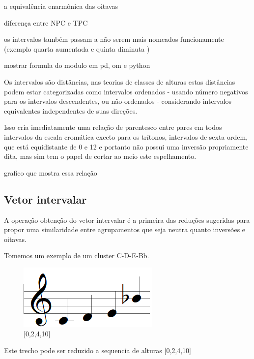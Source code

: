\documentclass[
	12pt,				%
	openright,			%
	twoside,			%
	a4paper,			%
	english,			%
	french,				%
	spanish,			%
	brazil				%
	]{abntex2}
\begin{document}
a equivalência enarmônica das oitavas

diferença entre NPC e TPC \cite[p. 118]{temperley2004cognition}

os intervalos também passam a não serem mais nomeados funcionamente (exemplo quarta aumentada e quinta diminuta )

mostrar formula do modulo em pd, om e python


Os intervalos são distâncias, nas teorias de classes de alturas estas distâncias podem estar categorizadas como intervalos ordenados - usando número negativos para os intervalos descendentes, ou não-ordenados - considerando intervalos equivalentes independentes de suas direções.\cite[pg. 6]{straus2004}


Isso cria imediatamente uma relação de parentesco entre pares em todos intervalos da escala cromática exceto para os trítonos, intervalos de sexta ordem, que está equidistante de 0 e 12 e portanto não possui uma inversão propriamente dita, mas sim tem o papel de cortar ao meio este espelhamento.

grafico que mostra essa relação 




\subsection{Vetor intervalar}

A operação obtenção do vetor intervalar é a primeira das reduções sugeridas para propor uma similaridade entre agrupamentos que seja neutra quanto inversões e oitavas.

Tomemos um exemplo de um cluster C-D-E-Bb.



\begin{figure}[!h]
	\caption{\label{fig_grafico}[0,2,4,10] }
	\begin{center}
	    \includegraphics[scale=0.6]{OM_settheory/vetor02410.png}
	\end{center}
\end{figure}


Este trecho pode ser reduzido a sequencia de alturas [0,2,4,10]
\end{document}

